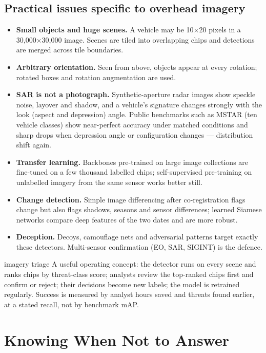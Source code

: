 \documentclass[11pt]{article}
\begin{document}
\subsection{Practical issues specific to overhead imagery}
\begin{itemize}
\item \textbf{Small objects and huge scenes.} A vehicle may be 10$\times$20 pixels in a 30,000$\times$30,000 image. Scenes are tiled into overlapping chips and detections are merged across tile boundaries.
\item \textbf{Arbitrary orientation.} Seen from above, objects appear at every rotation; rotated boxes and rotation augmentation are used.
\item \textbf{SAR is not a photograph.} Synthetic-aperture radar images show speckle noise, layover and shadow, and a vehicle's signature changes strongly with the look (aspect and depression) angle. Public benchmarks such as MSTAR (ten vehicle classes) show near-perfect accuracy under matched conditions and sharp drops when depression angle or configuration changes --- distribution shift again.
\item \textbf{Transfer learning.} Backbones pre-trained on large image collections are fine-tuned on a few thousand labelled chips; self-supervised pre-training on unlabelled imagery from the same sensor works better still.
\item \textbf{Change detection.} Simple image differencing after co-registration flags change but also flags shadows, seasons and sensor differences; learned Siamese networks compare deep features of the two dates and are more robust.
\item \textbf{Deception.} Decoys, camouflage nets and adversarial patterns target exactly these detectors. Multi-sensor confirmation (EO, SAR, SIGINT) is the defence.
\end{itemize}
\begin{defence}{imagery triage}
A useful operating concept: the detector runs on every scene and ranks chips by threat-class score; analysts review the top-ranked chips first and confirm or reject; their decisions become new labels; the model is retrained regularly. Success is measured by analyst hours saved and threats found earlier, at a stated recall, not by benchmark mAP.
\end{defence}

\section{Knowing When Not to Answer}
\end{document}
